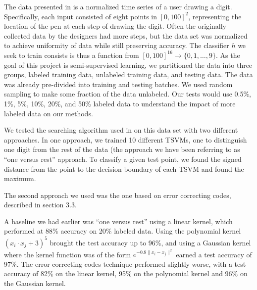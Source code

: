 \documentclass[11pt]{article}
\begin{document}
The data presented in \cite{Alpaydin:1998} is a normalized time series of a user drawing a digit. Specifically, each input consisted of eight points in $[0, 100]^2$, representing the location of the pen at each step of drawing the digit. Often the originally collected data by the designers had more steps, but the data set was normalized to achieve uniformity of data while still preserving accuracy. The classifier $h$ we seek to train consists is thus a function from $[0, 100]^{16} \to \{0, 1, \hdots, 9\}$.  As the goal of this project is semi-supervised learning, we partitioned the data into three groups, labeled training data, unlabeled training data, and testing data. The data was already pre-divided into training and testing batches. We used random sampling to make some fraction of the data unlabeled. Our tests would use 0.5\%, 1\%, 5\%, 10\%, 20\%, and 50\% labeled data to understand the impact of more labeled data on our methods.

We tested the searching algorithm used in \cite{Joachims:1999} on this data set
with two different approaches.
In one approach, we trained 10 different TSVMs, one to distinguish one digit from the rest of the data (the approach we have been referring to as ``one versus
rest'' approach.
To classify a given test point, we found the signed distance from the point to the decision boundary of each TSVM and found the maximum.


The second approach we used was the one based on error correcting codes,
described in section 3.3.

A baseline we had earlier was ``one versus rest'' using a linear kernel,
which performed at 88\% accuracy on 20\% labeled data. Using the polynomial
kernel $(x_i\cdot x_j + 3)^5$
brought the test accuracy up to 96\%, and using a Gaussian kernel
where the kernel function was of the form $e^{-0.8\|x_i-x_j\|^2}$
earned a test accuracy of 97\%. The error correcting codes technique
performed slightly worse, with a test accuracy of 82\% on the linear kernel,
95\% on the polynomial kernel and 96\% on the Gaussian kernel.
\end{document}
